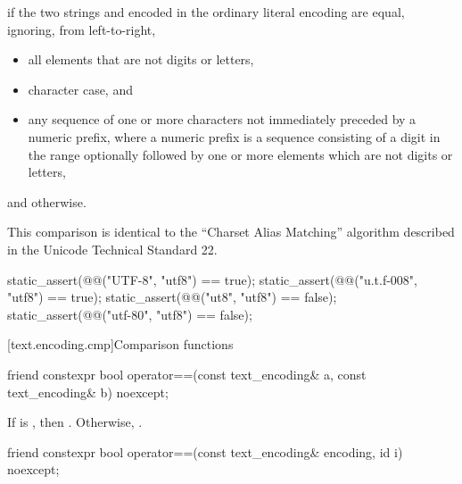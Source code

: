 \begin{itemdescr}
\pnum
\returns
{} if the two strings  and 
encoded in the ordinary literal encoding
are equal, ignoring, from left-to-right,
\begin{itemize}
\item
all elements that are not digits or letters,
\item
character case, and
\item
any sequence of one or more  characters
not immediately preceded by a numeric prefix, where
a numeric prefix is a sequence consisting of
a digit in the range 
optionally followed by one or more elements which are not digits or letters,
\end{itemize}
and  otherwise.

\begin{note}
This comparison is identical to
the ``Charset Alias Matching'' algorithm
described in the Unicode Technical Standard 22\supercite{unicode-charmap}.
\end{note}

\begin{example}
\begin{codeblock}
static_assert(@@("UTF-8", "utf8") == true);
static_assert(@@("u.t.f-008", "utf8") == true);
static_assert(@@("ut8", "utf8") == false);
static_assert(@@("utf-80", "utf8") == false);
\end{codeblock}
\end{example}
\end{itemdescr}

[text.encoding.cmp]{Comparison functions}

%
\begin{itemdecl}
friend constexpr bool operator==(const text_encoding& a, const text_encoding& b) noexcept;
\end{itemdecl}

\begin{itemdescr}
\pnum
\returns
If 
is ,
then .
Otherwise, .
\end{itemdescr}

%
\begin{itemdecl}
friend constexpr bool operator==(const text_encoding& encoding, id i) noexcept;
\end{itemdecl}

